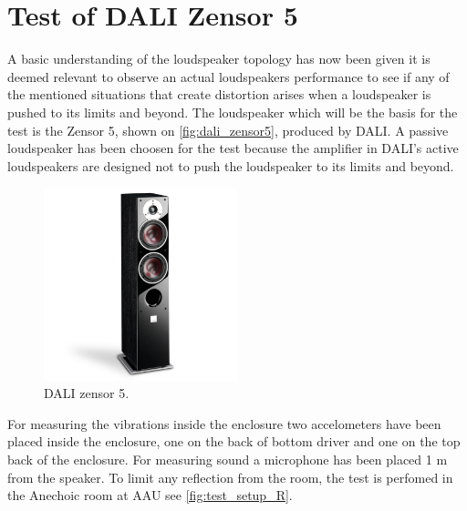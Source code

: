 \chapter{Test of DALI Zensor 5}
 A basic understanding of the loudspeaker topology has now been given it is deemed relevant to observe an actual loudspeakers performance to see if any of the mentioned situations that create distortion arises when a loudspeaker is pushed to its limits and beyond. %
 The loudspeaker which will be the basis for the test is the Zensor 5, shown on \autoref{fig:dali_zensor5}, produced by DALI. A passive loudspeaker has been choosen for the test because the amplifier in DALI's active loudspeakers are designed not to push the loudspeaker to its limits and beyond. %

\begin{figure}[H]
\centering
\includegraphics[width=0.5\textwidth]{figures/zensor5.png}
\caption{DALI zensor 5.}
\label{fig:dali_zensor5}
\end{figure}


For measuring the vibrations inside the enclosure two accelometers have been placed inside the enclosure, one on the back of bottom driver and one on the top back of the enclosure. For measuring sound a microphone has been placed 1 m from the speaker. To limit any reflection from the room, the test is perfomed in the Anechoic room at \gls{AAU} see \ref{fig:test_setup_R}.  




